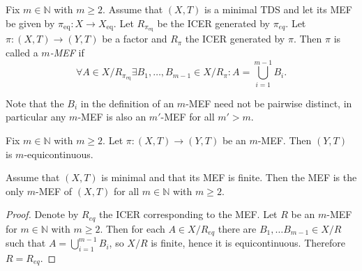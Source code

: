 \begin{comment}
	Now fix $(u_1, \dots, u_m) \in (X \times \mathbb{Z}/p\mathbb{Z})^m$ with $x = \pi_X(u_i)$ for all $i \in \{1, \dots, m\}$ and some $x \in X$ and let $\varepsilon > 0$ be given. There is some $k \in \mathbb{N}$ such that $\frac{1}{k} < \frac{\varepsilon}{m}$ and some $n \in \mathbb{N}$ such that $o^m x$ starts with $n$ zeroes.
\end{proof}
\end{comment}

\begin{definition}[$m$-MEF]
	Fix $m \in \mathbb{N}$ with $m \geq 2$. Assume that $(X, T)$ is a minimal TDS and let its MEF be given by $\pi_{\mathrm{eq}}: X \to X_{\mathrm{eq}}$. Let $R_{\pi_{\mathrm{eq}}}$ be the ICER generated by $\pi_{eq}$. Let $\pi: (X,T) \to (Y,T)$ be a factor and $R_\pi$ the ICER generated by $\pi$.
	Then $\pi$ is called a \emph{$m$-MEF} if
	\begin{equation*}
		\forall A \in X/R_{\pi_{\mathrm{eq}}} \exists B_1, \dots, B_{m-1} \in X/R_\pi: 
		A = \bigcup_{i=1}^{m-1} B_i.
	\end{equation*}
\end{definition}

\begin{remark}
	Note that the $B_i$ in the definition of an $m$-MEF need not be pairwise distinct, in particular any $m$-MEF is also an $m'$-MEF for all $m' > m$.
\end{remark}

\begin{proposition}
	Fix $m \in \mathbb{N}$ with $m \geq 2$. Let $\pi : (X,T) \to (Y, T)$ be an $m$-MEF. Then $(Y, T)$ is $m$-equicontinuous.
\end{proposition}

\begin{proposition}
	Assume that $(X, T)$ is minimal and that its MEF is finite. Then the MEF is the only $m$-MEF of $(X, T)$ for all $m \in \mathbb{N}$ with $m \geq 2$.
\end{proposition}
\begin{proof}
	Denote by $R_{eq}$ the ICER corresponding to the MEF. Let $R$ be an $m$-MEF for $m \in \mathbb{N}$ with $m \geq 2$. Then for each $A \in X/R_{eq}$ there are $B_1, \dots B_{m-1} \in X/R$ such that $A = \bigcup_{i=1}^{m-1} B_i$, so $X/R$ is finite, hence it is equicontinuous. Therefore $R = R_{eq}$.
\end{proof}

